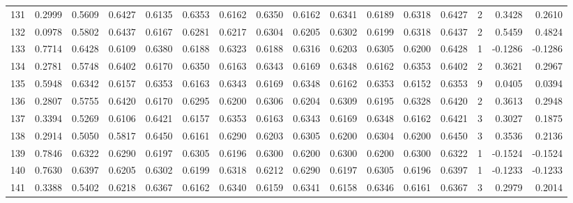 \begin{tabular}{lrrrrrrrrrrrrrrr}
131 &      0.2999 &  0.5609 &  0.6427 &  0.6135 &  0.6353 &  0.6162 &  0.6350 &  0.6162 &  0.6341 &  0.6189 &   0.6318 &     0.6427 &      2 &                    0.3428 &                     0.2610 \\
132 &      0.0978 &  0.5802 &  0.6437 &  0.6167 &  0.6281 &  0.6217 &  0.6304 &  0.6205 &  0.6302 &  0.6199 &   0.6318 &     0.6437 &      2 &                    0.5459 &                     0.4824 \\
133 &      0.7714 &  0.6428 &  0.6109 &  0.6380 &  0.6188 &  0.6323 &  0.6188 &  0.6316 &  0.6203 &  0.6305 &   0.6200 &     0.6428 &      1 &                   -0.1286 &                    -0.1286 \\
134 &      0.2781 &  0.5748 &  0.6402 &  0.6170 &  0.6350 &  0.6163 &  0.6343 &  0.6169 &  0.6348 &  0.6162 &   0.6353 &     0.6402 &      2 &                    0.3621 &                     0.2967 \\
135 &      0.5948 &  0.6342 &  0.6157 &  0.6353 &  0.6163 &  0.6343 &  0.6169 &  0.6348 &  0.6162 &  0.6353 &   0.6152 &     0.6353 &      9 &                    0.0405 &                     0.0394 \\
136 &      0.2807 &  0.5755 &  0.6420 &  0.6170 &  0.6295 &  0.6200 &  0.6306 &  0.6204 &  0.6309 &  0.6195 &   0.6328 &     0.6420 &      2 &                    0.3613 &                     0.2948 \\
137 &      0.3394 &  0.5269 &  0.6106 &  0.6421 &  0.6157 &  0.6353 &  0.6163 &  0.6343 &  0.6169 &  0.6348 &   0.6162 &     0.6421 &      3 &                    0.3027 &                     0.1875 \\
138 &      0.2914 &  0.5050 &  0.5817 &  0.6450 &  0.6161 &  0.6290 &  0.6203 &  0.6305 &  0.6200 &  0.6304 &   0.6200 &     0.6450 &      3 &                    0.3536 &                     0.2136 \\
139 &      0.7846 &  0.6322 &  0.6290 &  0.6197 &  0.6305 &  0.6196 &  0.6300 &  0.6200 &  0.6300 &  0.6200 &   0.6300 &     0.6322 &      1 &                   -0.1524 &                    -0.1524 \\
140 &      0.7630 &  0.6397 &  0.6205 &  0.6302 &  0.6199 &  0.6318 &  0.6212 &  0.6290 &  0.6197 &  0.6305 &   0.6196 &     0.6397 &      1 &                   -0.1233 &                    -0.1233 \\
141 &      0.3388 &  0.5402 &  0.6218 &  0.6367 &  0.6162 &  0.6340 &  0.6159 &  0.6341 &  0.6158 &  0.6346 &   0.6161 &     0.6367 &      3 &                    0.2979 &                     0.2014 \\

\end{tabular}
